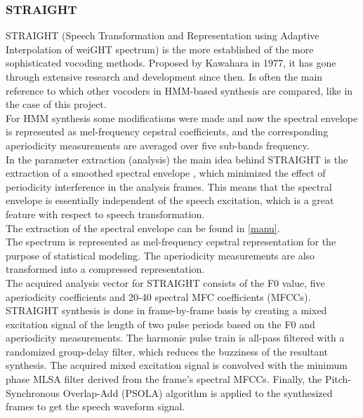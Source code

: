\subsubsection{STRAIGHT}
STRAIGHT (Speech Transformation and Representation using Adaptive Interpolation of weiGHT spectrum) is the more established of the more sophisticated vocoding methods. Proposed by Kawahara in 1977, it has gone through extensive research and development since then. Is often the main reference to which other vocoders in HMM-based synthesis are compared, like in the case of this project.\\
For HMM synthesis some modifications were made and now the spectral envelope is represented as mel-frequency cepstral coefficients, and the corresponding aperiodicity measurements are averaged over five sub-bands frequency.\\
In the parameter extraction (analysis) the main idea behind STRAIGHT is the extraction of a smoothed spectral envelope , which minimized the effect of periodicity interference in the analysis frames. This means that the spectral envelope is essentially independent of the speech excitation, which is a great feature with respect to speech transformation.\\
The extraction of the spectral envelope can be found in \ref{manu}.\\
The spectrum is represented as mel-frequency cepstral representation for the purpose of statistical modeling. The aperiodicity measurements are also transformed into a compressed representation. \\
The acquired analysis vector for STRAIGHT consists of the F0 value, five aperiodicity coefficients and 20-40 spectral MFC coefficients (MFCCs). \\
STRAIGHT synthesis is done in frame-by-frame basis by creating a mixed excitation signal of the length of two pulse periods based on the F0 and aperiodicity measurements. The harmonic pulse train is all-pass filtered with a randomized group-delay filter, which reduces the buzziness of the resultant synthesis. The acquired mixed excitation signal is convolved with the minimum phase MLSA filter derived from the frame's spectral MFCCs. Finally, the Pitch-Synchronous Overlap-Add (PSOLA) algorithm is applied to the synthesized frames to get the speech waveform signal.  
